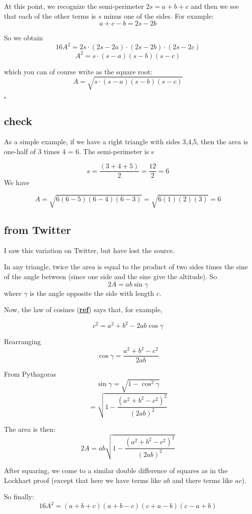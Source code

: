 \documentclass[11pt, oneside]{article}
\begin{document}
At this point, we recognize the semi-perimeter $2s = a + b + c$ and then we see that each of the other terms is $s$ minus one of the sides.  For example:
\[ a + c - b = 2s - 2b \]

So we obtain
\[ 16A^2 = 2s \cdot (2s - 2a) \cdot (2s - 2b) \cdot (2s - 2c) \]
\[ A^2 = s \cdot (s - a)(s - b)(s - c) \]

which you can of course write as the square root:
\[ A = \sqrt{s \cdot (s - a)(s - b)(s - c)} \]

$\square$

\subsection*{check}
As a simple example, if we have a right triangle with sides 3,4,5, then the area is one-half of 3 times 4 = 6.  The semi-perimeter is s

\[ s = \frac{(3 + 4 + 5)}{2} = \frac{12}{2} = 6 \]
We have

\[ A =  \sqrt { 6 (6-5) (6-4) (6-3) } =  \sqrt { 6 (1) (2) (3) } = 6 \]

\subsection*{from Twitter}

I saw this variation on Twitter, but have lost the source.

In any triangle, twice the area is equal to the product of two sides times the sine of the angle between (since one side and the sine give the altitude).  So
\[ 2A = ab \sin \gamma \]
where $\gamma$ is the angle opposite the side with length $c$.

Now, the law of cosines (\hyperref[sec:Law_of_cosines]{\textbf{ref}}) says that, for example,

\[ c^2 = a^2 + b^2 - 2ab \cos \gamma \]

Rearranging
\[ \cos \gamma = \frac{a^2 + b^2 - c^2}{2ab} \]

From Pythagoras 
\[ \sin \gamma = \sqrt{1 - \cos^2 \gamma} \]
\[ = \sqrt{1 - \frac{(a^2 + b^2 - c^2)^2}{(2ab)^2}} \]

The area is then:
\[ 2A = ab \sqrt{1 - \frac{(a^2 + b^2 - c^2)^2}{(2ab)^2}} \]

After squaring, we come to a similar double difference of squares as in the Lockhart proof (except that here we have terms like $ab$ and there terms like $ac$).

So finally:
\[ 16A^2 = (a + b + c)(a + b - c)(c + a - b)(c - a + b) \]
\end{document}
